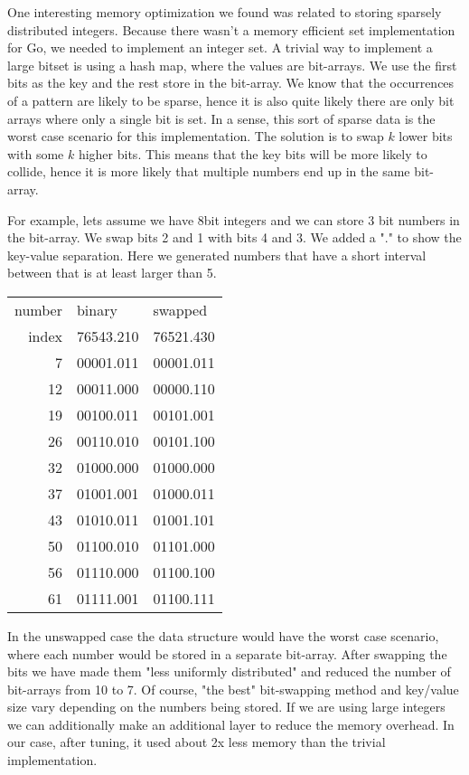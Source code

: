 One interesting memory optimization we found was related to storing sparsely distributed integers. Because there wasn't a memory efficient set implementation for Go, we needed to implement an integer set. A trivial way to implement a large bitset is using a hash map, where the values are bit-arrays. We use the first bits as the key and the rest store in the bit-array. We know that the occurrences of a pattern are likely to be sparse, hence it is also quite likely there are only bit arrays where only a single bit is set. In a sense, this sort of sparse data is the worst case scenario for this implementation. The solution is to swap $k$ lower bits with some $k$ higher bits. This means that the key bits will be more likely to collide, hence it is more likely that multiple numbers end up in the same bit-array.

For example, lets assume we have 8bit integers and we can store 3 bit numbers in the bit-array. We swap bits 2 and 1 with bits 4 and 3. We added a "." to show the key-value separation. Here we generated numbers that have a short interval between that is at least larger than 5.

\begin{center}
    \small
    \begin{tabular}{ | r | l | l | }
    \hline
    number & binary & swapped \\
    index & 76543.210 & 76521.430 \\
    \hline
     7 & 00001.011 & 00001.011 \\
    12 & 00011.000 & 00000.110 \\
    19 & 00100.011 & 00101.001 \\
    26 & 00110.010 & 00101.100 \\
    32 & 01000.000 & 01000.000 \\
    37 & 01001.001 & 01000.011 \\
    43 & 01010.011 & 01001.101 \\
    50 & 01100.010 & 01101.000 \\
    56 & 01110.000 & 01100.100 \\
    61 & 01111.001 & 01100.111 \\
    \hline
    \end{tabular}    
\end{center}

In the unswapped case the data structure would have the worst case scenario, where each number would be stored in a separate bit-array. After swapping the bits we have made them "less uniformly distributed" and reduced the number of bit-arrays from 10 to 7. Of course, "the best" bit-swapping method and key/value size vary depending on the numbers being stored. If we are using large integers we can additionally make an additional layer to reduce the memory overhead. In our case, after tuning, it used about 2x less memory than the trivial implementation.

